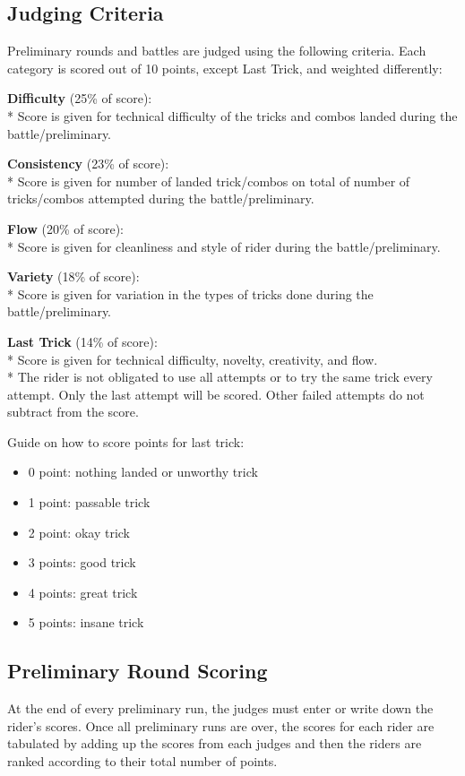 \subsection{Judging Criteria}

Preliminary rounds and battles are judged using the following criteria.
Each category is scored out of 10 points, except Last Trick, and weighted differently:

\textbf{Difficulty} (25\% of score): \\*
Score is given for technical difficulty of the tricks and combos landed during the battle/preliminary.

\textbf{Consistency} (23\% of score): \\*
Score is given for number of landed trick/combos on total of number of tricks/combos attempted during the battle/preliminary.

\textbf{Flow} (20\% of score): \\*
Score is given for cleanliness and style of rider during the battle/preliminary.

\textbf{Variety} (18\% of score): \\*
Score is given for variation in the types of tricks done during the battle/preliminary.

\textbf{Last Trick} (14\% of score): \\*
Score is given for technical difficulty, novelty, creativity, and flow.\\*
The rider is not obligated to use all attempts or to try the same trick every attempt.
Only the last attempt will be scored.
Other failed attempts do not subtract from the score.

Guide on how to score points for last trick:
\begin{itemize}
\item 0 point: nothing landed or unworthy trick
\item 1 point: passable trick
\item 2 point: okay trick
\item 3 points: good trick
\item 4 points: great trick
\item 5 points: insane trick
\end{itemize}

\subsection{Preliminary Round Scoring}
At the end of every preliminary run, the judges must enter or write down the rider's scores.
Once all preliminary runs are over, the scores for each rider are tabulated by adding up the scores from each judges and then the riders are ranked according to their total number of points.

